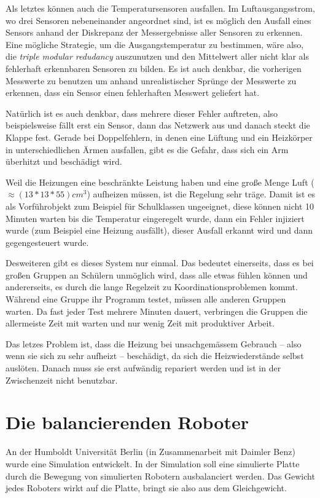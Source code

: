 Als letztes k{\"{o}}nnen auch die Temperatursensoren ausfallen. Im Luftausgangsstrom, wo drei Sensoren 
nebeneinander angeordnet sind, ist es m{\"{o}}glich den
Ausfall eines Sensors anhand der Diskrepanz der Messergebnisse aller Sensoren zu erkennen. Eine m{\"{o}}gliche 
Strategie, um die Ausgangstemperatur zu
bestimmen, w{\"{a}}re also, die \textit{triple modular redudancy} auszunutzen und den Mittelwert aller nicht klar als 
fehlerhaft erkennbaren Sensoren zu bilden.
Es ist auch denkbar, die vorherigen Messwerte zu benutzen um anhand unrealistischer Spr{\"{u}}nge der Messwerte zu 
erkennen, dass ein Sensor einen fehlerhaften Messwert geliefert hat.

Nat{\"{u}}rlich ist es auch denkbar, dass mehrere dieser Fehler auftreten, also beispielsweise f{\"{a}}llt
erst ein Sensor, dann das Netzwerk aus und danach steckt die Klappe fest.
Gerade bei Doppelfehlern, in denen eine L{\"{u}}ftung und ein Heizk{\"{o}}rper in unterschiedlichen {\"{A}}rmen 
ausfallen, gibt es die Gefahr, dass sich ein Arm {\"{u}}berhitzt und besch{\"{a}}digt wird.

Weil die Heizungen eine beschr{\"{a}}nkte Leistung haben und eine gro{\ss}e Menge Luft 
($ \approx (13*13*55)cm^3$) aufheizen m{\"{u}}ssen, ist die Regelung sehr tr{\"{a}}ge. Damit ist es als
Vorf{\"{u}}hrobjekt zum Beispiel f{\"{u}}r Schulklassen ungeeignet, diese k{\"{o}}nnen nicht 10 Minuten warten
bis die Temperatur eingeregelt wurde, dann ein Fehler injiziert wurde (zum Beispiel eine Heizung
ausf{\"{a}}llt), dieser Ausfall erkannt wird und dann gegengesteuert wurde.

Desweiteren gibt es dieses System nur einmal. Das bedeutet einerseits, dass es bei gro{\ss}en Gruppen
an Sch{\"{u}}lern unm{\"{o}}glich wird, dass alle etwas f{\"{u}}hlen k{\"{o}}nnen und andererseits, es durch
die lange Regelzeit zu Koordinationsproblemen kommt. W{\"{a}}hrend eine Gruppe ihr Programm testet, m{\"{u}}ssen
alle anderen Gruppen warten. Da fast jeder Test mehrere Minuten dauert, verbringen die Gruppen die
allermeiste Zeit mit warten und nur wenig Zeit mit produktiver Arbeit.

Das letzes Problem ist, dass die Heizung bei unsachgem{\"{a}}ssem Gebrauch -- also wenn sie sich zu sehr aufheizt --
besch{\"{a}}digt, da sich die Heizwiederst{\"{a}}nde selbst ausl{\"{o}}ten. Danach muss sie erst aufw{\"{a}}ndig
repariert werden und ist in der Zwischenzeit nicht benutzbar.

\clearpage
\section{Die balancierenden Roboter}
An der Humboldt Universit{\"{a}}t Berlin (in Zusammenarbeit mit Daimler Benz) wurde eine
Simulation\cite{Werner00} entwickelt. In der Simulation soll eine simulierte Platte durch die Bewegung von 
simulierten Robotern ausbalanciert werden. Das Gewicht jedes Roboters wirkt auf die Platte, bringt sie also
aus dem Gleichgewicht.

